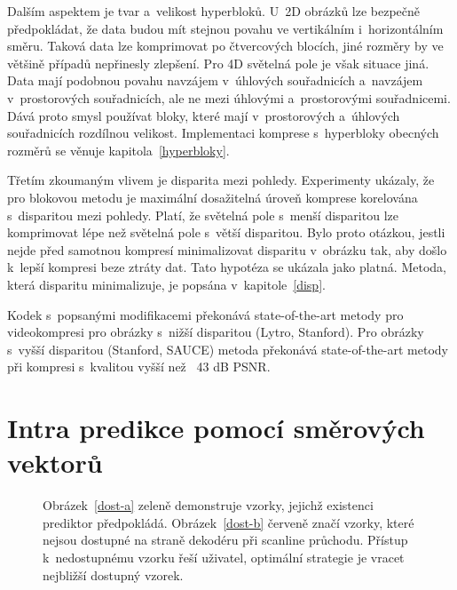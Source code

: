 Dalším aspektem je tvar a~velikost hyperbloků.
U~2D obrázků lze bezpečně předpokládat, že data budou mít stejnou povahu ve vertikálním i~horizontálním směru.
Taková data lze komprimovat po čtvercových blocích, jiné roz\-měry by ve většině případů nepřinesly zlepšení.
Pro 4D světelná pole je však situace jiná.
Data mají podobnou povahu navzájem v~úhlových souřadnicích a~navzájem v~pro\-s\-torových souřadnicích, ale ne mezi úhlovými a~pro\-s\-torovými souřadnicemi.
Dává proto smysl používat bloky, které mají v~pro\-s\-torových a~úhlových souřadnicích rozdílnou velikost.
Implementaci kom\-pre\-se s~hyperbloky obecných roz\-měrů se věnuje kapitola~\ref{hyperbloky}.

Třetím zkoumaným vlivem je disparita mezi po\-hledy.
Experimenty ukázaly, že pro blokovou me\-to\-du je maximální dosažitelná úroveň kom\-pre\-se korelována s~disparitou mezi po\-hledy.
Platí, že světelná pole s~menší disparitou lze komprimovat lépe než světelná pole s~větší disparitou.
Bylo proto otázkou, jestli nejde před samotnou kom\-pre\-sí minimalizovat disparitu v~obrázku tak, aby došlo k~lepší kom\-pre\-si beze ztráty dat.
Tato hypotéza se ukázala jako platná.
Metoda, která disparitu minimalizuje, je popsána v~kapitole~\ref{disp}.

Kodek s~popsanými modifikacemi překonává state-of-the-art metody pro videokompresi pro obrázky s~nižší disparitou (Lytro, Stanford).
Pro obrázky s~vyšší disparitou (Stanford, SAUCE) metoda překonává state-of-the-art metody při kompresi s~kvalitou vyšší než ~43 dB PSNR.

\section{Intra pre\-dikce pomocí směr\-ových vektorů}\label{pred}

\begin{figure}[htbp]\centering
  \centering
  \hfill
  \vspace*{1em}
  \caption{Obrázek~\ref{dost-a} zeleně demonstruje vzorky, jejichž existenci pre\-diktor předpokládá.
  Obrázek~\ref{dost-b} červeně značí vzorky, které nejsou dostupné na straně dekodéru při scanline průchodu.
  Přístup k~nedostupnému vzorku řeší uživatel, optimální strategie je vracet nejbližší dostupný vzorek.}
  \label{fig:dost}
\end{figure}

